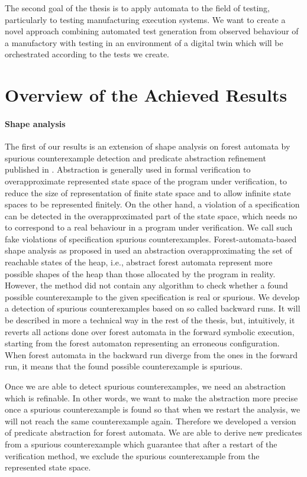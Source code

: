 The second goal of the thesis is to apply automata to the field of testing, particularly
to testing manufacturing execution systems.
We want to create a novel approach combining automated test generation from
observed behaviour of a manufactory with testing in an environment of a digital twin
which will be orchestrated according to the tests we create.

\section{Overview of the Achieved Results}
\paragraph{Shape analysis}
The first of our results is an extension of shape analysis on forest automata by
spurious counterexample detection and predicate abstraction refinement published in \cite{vmcai17}.
Abstraction is generally used in formal verification to overapproximate
represented state space of the program under verification, to reduce the size of representation
of finite state space and to allow infinite state spaces to be represented finitely.
On the other hand, a violation of a specification can be detected in the overapproximated
part of the state space, which needs no to correspond to a real behaviour in a program under verification.
We call such fake violations of specification spurious counterexamples.
Forest-automata-based shape analysis as proposed in \cite{forester11, boxes13} used an abstraction overapproximating
the set of reachable states of the heap, i.e., abstract forest automata represent more possible shapes of the heap
than those allocated by the program in reality.
However, the method did not contain any algorithm to check whether a found possible counterexample
to the given specification is real or spurious.
We develop a detection of spurious counterexamples based on so called backward runs.
It will be described in more a technical way in the rest of the thesis, but, intuitively, it
reverts all actions done over forest automata in the forward symbolic execution,
starting from the forest automaton representing an erroneous configuration.
When forest automata in the backward run diverge from the ones in the forward run,
it means that the found possible counterexample is spurious.

Once we are able to detect spurious counterexamples, we need an abstraction which is refinable. 
In other words, we want to make the abstraction more precise once a spurious counterexample is found
so that when we restart the analysis, we will not reach the same counterexample again.
Therefore we developed a version of predicate abstraction for forest automata.
We are able to derive new predicates from a spurious counterexample which
guarantee that after a restart of the verification method, we exclude the spurious counterexample
from the represented state space.

